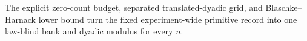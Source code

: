 The explicit zero-count budget, separated translated-dyadic grid, and Blaschke--Harnack lower bound turn the fixed experiment-wide primitive record into one law-blind bank and dyadic modulus for every \(n\).
